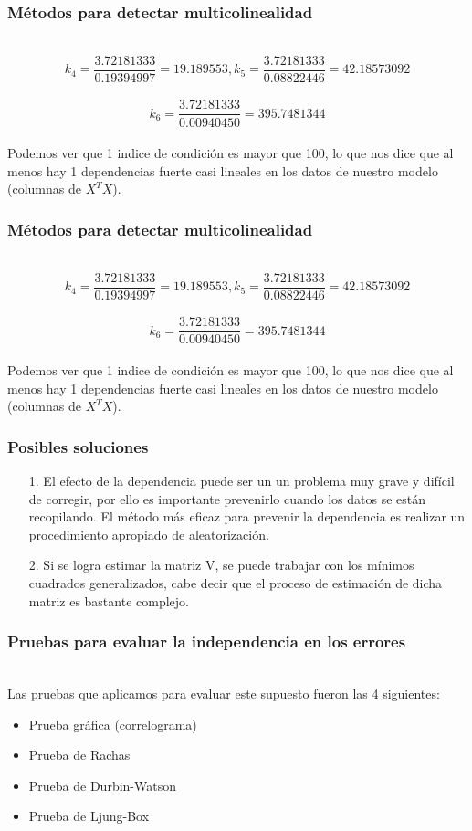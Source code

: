 \documentclass[12pt]{beamer}
\begin{document}
\begin{frame}
\frametitle{Métodos para detectar multicolinealidad}
~\\$$k_{4}=\frac{3.72181333}{0.19394997}=19.189553,k_{5}=\frac{3.72181333}{0.08822446}=42.18573092$$
~\\$$k_{6}=\frac{3.72181333}{0.00940450}=395.7481344$$
~\\Podemos ver que 1 indice de condición es mayor que 100, lo que nos dice que al menos hay 1 dependencias fuerte casi lineales en los datos de nuestro modelo (columnas de $X^{T}X$).
\end{frame}

\begin{frame}
\frametitle{Métodos para detectar multicolinealidad}
~\\$$k_{4}=\frac{3.72181333}{0.19394997}=19.189553,k_{5}=\frac{3.72181333}{0.08822446}=42.18573092$$
~\\$$k_{6}=\frac{3.72181333}{0.00940450}=395.7481344$$
~\\Podemos ver que 1 indice de condición es mayor que 100, lo que nos dice que al menos hay 1 dependencias fuerte casi lineales en los datos de nuestro modelo (columnas de $X^{T}X$).
\end{frame}

\begin{frame}
\frametitle{Posibles soluciones}
\begin{itemize}
\item[1.]El efecto de la dependencia puede ser un un problema muy grave y difícil de corregir, por ello es importante prevenirlo cuando los datos se están recopilando. El método más eficaz para prevenir la dependencia es realizar un procedimiento apropiado de aleatorización.
\item[2.]Si se logra estimar la matriz V, se puede trabajar con los mínimos cuadrados generalizados, cabe decir que el proceso de estimación de dicha matriz es bastante complejo.
\end{itemize}
\end{frame}

\begin{frame}
\frametitle{Pruebas para evaluar la independencia en los errores}
~\\ Las pruebas que aplicamos para evaluar este supuesto fueron las 4 siguientes:
\begin{itemize}
\item Prueba gráfica (correlograma)
\item Prueba de Rachas
\item Prueba de Durbin-Watson
\item Prueba de Ljung-Box
\end{itemize}
\end{frame}
\end{document}
